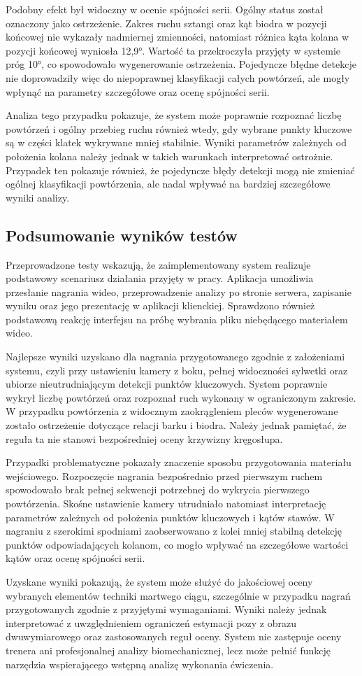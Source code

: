 Podobny efekt był widoczny w ocenie spójności serii. Ogólny status został oznaczony jako ostrzeżenie. Zakres ruchu sztangi oraz kąt biodra w pozycji końcowej nie wykazały nadmiernej zmienności, natomiast różnica kąta kolana w pozycji końcowej wyniosła 12{,}9°. Wartość ta przekroczyła przyjęty w systemie próg 10°, co spowodowało wygenerowanie ostrzeżenia. Pojedyncze błędne detekcje nie doprowadziły więc do niepoprawnej klasyfikacji całych powtórzeń, ale mogły wpłynąć na parametry szczegółowe oraz ocenę spójności serii.

Analiza tego przypadku pokazuje, że system może poprawnie rozpoznać liczbę powtórzeń i ogólny przebieg ruchu również wtedy, gdy wybrane punkty kluczowe są w części klatek wykrywane mniej stabilnie. Wyniki parametrów zależnych od położenia kolana należy jednak w takich warunkach interpretować ostrożnie. Przypadek ten pokazuje również, że pojedyncze błędy detekcji mogą nie zmieniać ogólnej klasyfikacji powtórzenia, ale nadal wpływać na bardziej szczegółowe wyniki analizy.

\subsection{Podsumowanie wyników testów}

Przeprowadzone testy wskazują, że zaimplementowany system realizuje podstawowy scenariusz działania przyjęty w pracy. Aplikacja umożliwia przesłanie nagrania wideo, przeprowadzenie analizy po stronie serwera, zapisanie wyniku oraz jego prezentację w aplikacji klienckiej. Sprawdzono również podstawową reakcję interfejsu na próbę wybrania pliku niebędącego materiałem wideo.

Najlepsze wyniki uzyskano dla nagrania przygotowanego zgodnie z założeniami systemu, czyli przy ustawieniu kamery z boku, pełnej widoczności sylwetki oraz ubiorze nieutrudniającym detekcji punktów kluczowych. System poprawnie wykrył liczbę powtórzeń oraz rozpoznał ruch wykonany w ograniczonym zakresie. W przypadku powtórzenia z widocznym zaokrągleniem pleców wygenerowane zostało ostrzeżenie dotyczące relacji barku i biodra. Należy jednak pamiętać, że reguła ta nie stanowi bezpośredniej oceny krzywizny kręgosłupa.

Przypadki problematyczne pokazały znaczenie sposobu przygotowania materiału wejściowego. Rozpoczęcie nagrania bezpośrednio przed pierwszym ruchem spowodowało brak pełnej sekwencji potrzebnej do wykrycia pierwszego powtórzenia. Skośne ustawienie kamery utrudniało natomiast interpretację parametrów zależnych od położenia punktów kluczowych i kątów stawów. W nagraniu z szerokimi spodniami zaobserwowano z kolei mniej stabilną detekcję punktów odpowiadających kolanom, co mogło wpływać na szczegółowe wartości kątów oraz ocenę spójności serii.

Uzyskane wyniki pokazują, że system może służyć do jakościowej oceny wybranych elementów techniki martwego ciągu, szczególnie w przypadku nagrań przygotowanych zgodnie z przyjętymi wymaganiami. Wyniki należy jednak interpretować z uwzględnieniem ograniczeń estymacji pozy z obrazu dwuwymiarowego oraz zastosowanych reguł oceny. System nie zastępuje oceny trenera ani profesjonalnej analizy biomechanicznej, lecz może pełnić funkcję narzędzia wspierającego wstępną analizę wykonania ćwiczenia.